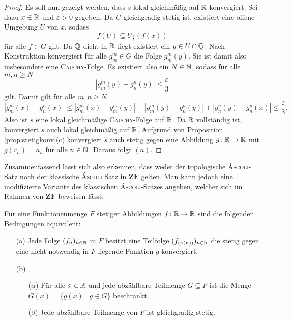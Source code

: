 \begin{proof}
  Es soll nun gezeigt werden, dass $s$ lokal gleichmäßig auf $\mathbb{R}$ konvergiert.
  Sei dazu $x \in \mathbb{R}$ und $\varepsilon > 0$ gegeben.
  Da $G$ gleichgradig stetig ist, existiert eine offene Umgebung $U$ von $x$, sodass
  \begin{displaymath}
    f(U) \subseteq U_\frac{\varepsilon}{3}(f(x))
  \end{displaymath}
  für alle $f \in G$ gilt.
  Da $\mathbb{Q}$ dicht in $\mathbb{R}$ liegt existiert ein $y \in U \cap \mathbb{Q}$.
  Nach Konstruktion konvergiert für alle $g_m^m \in G$ die Folge $g_m^m(y)$.
  Sie ist damit also insbesondere eine \textsc{Cauchy}-Folge.
  Es existiert also ein $N \in \mathbb{N}$, sodass für alle $m,n \geq N$
  \begin{displaymath}
    | g_m^m(y) - g_n^n(y) | \leq \frac{\varepsilon}{3}
  \end{displaymath}
  gilt.
  Damit gilt für alle $m, n \geq N$
  \begin{displaymath}
    | g_m^m(x) - g_n^n(x) |
    \leq 
    | g_m^m(x) - g_m^m(y) | +  | g_m^m(y) - g_n^n(y) | +  | g_n^n(y) - g_n^n(x) |
    \leq
    \frac{\varepsilon}{3}.
  \end{displaymath}
  Also ist $s$ eine lokal gleichmäßige \textsc{Cauchy}-Folge auf $\mathbb{R}$.
  Da $\mathbb{R}$ vollständig ist, konvergiert $s$ auch lokal gleichmäßig auf $\mathbb{R}$. 
  Aufgrund von Proposition \ref{prop:stetigkonv}(c) konvergiert $s$ auch stetig gegen eine Abbildung $g \colon \mathbb{R} \to \mathbb{R}$ mit $g(r_n) = a_n$ für alle $n \in \mathbb{N}$.
  Daraus folgt $(a)$.
\end{proof}

Zusammenfassend lässt sich also erkennen, dass weder der topologische \textsc{Áscoli}-Satz noch der klassische \textsc{Áscoli} Satz in $\mathbf{ZF}$ gelten. Man kann jedoch eine modifizierte Variante des klassischen \textsc{Áscoli}-Satzes angeben, welcher sich im Rahmen von $\mathbf{ZF}$ beweisen lässt:

\begin{thm}
  Für eine Funktionenmenge $F$ stetiger Abbildungen $f \colon \mathbb{R} \to \mathbb{R}$ sind die folgenden Bedingungen äquivalent:
  \begin{itemize}
    \item[(a)] Jede Folge $(f_n)_{n \in \mathbb{N}}$ in $F$ besitzt eine Teilfolge $(f_{(\nu(n))})_{n \in \mathbb{N}}$ die stetig gegen eine nicht notwendig in $F$ liegende Funktion $g$ konvergiert.

    \item[(b)]
      \begin{itemize}
        \item[($\alpha$)] Für alle $x \in \mathbb{R}$ und jede abzählbare Teilmenge $G \subseteq F$ ist die Menge $G(x) = \{ g(x) \mid g \in G \}$ beschränkt.
        \item[($\beta$)] Jede abzählbare Teilmenge von $F$ ist gleichgradig stetig.
      \end{itemize}
  \end{itemize}
\end{thm}

